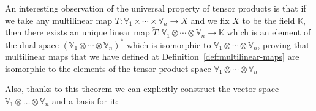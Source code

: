 \documentclass[11pt,a4paper,openright,oneside]{book}
\numberwithin{equation}{section}
\newcommand{\defref}[1]{Definition~\ref{#1}}
\begin{document}
An interesting observation of the universal property of tensor products is that if we take any multilinear map ${T: \mathbb{V}_1 \times \cdots \times \mathbb{V}_n \rightarrow X}$
and we fix $X$ to be the field $\mathbb{K}$, then there exists an unique linear map $\tilde T: \mathbb{V}_1 \otimes \cdots \otimes \mathbb{V}_n \rightarrow \mathbb{K}$
which is an element of the dual space $(\mathbb{V}_1 \otimes \cdots \otimes \mathbb{V}_n)^*$ which is isomorphic to $\mathbb{V}_1 \otimes \cdots \otimes \mathbb{V}_n$, proving
that multilinear maps that we have defined at \defref{def:multilinear-maps} are isomorphic to the elements of the tensor product space
$\mathbb{V}_1 \otimes \cdots \otimes \mathbb{V}_n$

Also, thanks to this theorem we can explicitly construct the vector space ${\mathbb{V}_1 \otimes \dots \otimes \mathbb{V}_n}$ and a
basis for it:
\end{document}
